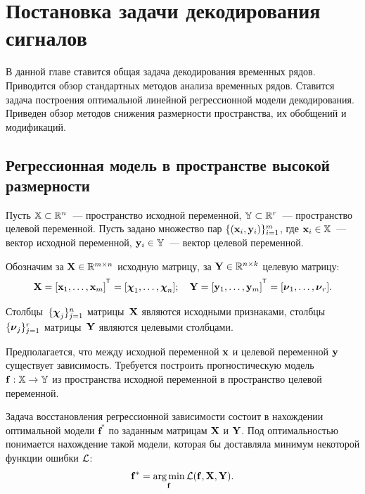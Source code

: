 \chapter{Постановка задачи декодирования сигналов}
\label{ch:intro}

В данной главе ставится общая задача декодирования временных рядов.
Приводится обзор стандартных методов анализа временных рядов.
Ставится задача построения оптимальной линейной регрессионной модели декодирования.
Приведен обзор методов снижения размерности пространства, их обобщений и модификаций.

\section{Регрессионная модель в пространстве высокой размерности}
\label{sec:ch1:reg_model}

Пусть $\mathbb{X} \subset \mathbb{R}^n$~--- пространство исходной переменной, $\mathbb{Y} \subset \mathbb{R}^r$~--- пространство целевой переменной.
Пусть задано множество пар $\{(\mathbf{x}_i, \mathbf{y}_i)\}_{i=1}^m$, где $\mathbf{x}_i \in \mathbb{X}$~--- вектор исходной переменной, $\mathbf{y}_i \in \mathbb{Y}$~--- вектор целевой переменной.

Обозначим за $\mathbf{X} \in \mathbb{R}^{m \times n}$ исходную матрицу, за $\mathbf{Y} \in \mathbb{R}^{n \times k}$ целевую матрицу:
\begin{equation*}
	\bX = [\bx_1, \dots, \bx_m]^{\T} =  [\bchi_1, \dots, \bchi_n]; \quad \bY = [\by_1, \dots, \by_m]^{\T} =  [\bnu_1, \dots, \bnu_r].
\end{equation*}

Столбцы~$\{\boldsymbol{\chi}_j\}_{j=1}^n$ матрицы~$\mathbf{X}$ являются исходными признаками, столбцы~$\{\boldsymbol{\nu}_j\}_{j=1}^r$ матрицы~$\mathbf{Y}$ являются целевыми столбцами.

Предполагается, что между исходной переменной $\mathbf{x}$ и целевой переменной $\mathbf{y}$ существует зависимость. Требуется построить прогностическую модель $\mathbf{f}: \mathbb{X} \rightarrow \mathbb{Y}$ из пространства исходной переменной в пространство целевой переменной.

Задача восстановления регрессионной зависимости состоит в нахождении оптимальной модели $\mathbf{f}^*$ по заданным матрицам $\mathbf{X}$ и $\mathbf{Y}$. Под оптимальностью понимается нахождение такой модели, которая бы доставляла минимум некоторой функции ошибки $\mathcal{L}$:
\begin{equation}
	\mathbf{f}^* = \mathop{\arg \min}\limits_\mathbf{f} \mathcal{L}(\mathbf{f}, \mathbf{X}, \mathbf{Y}).
	\label{ch1:eq:loss_min}
\end{equation}

